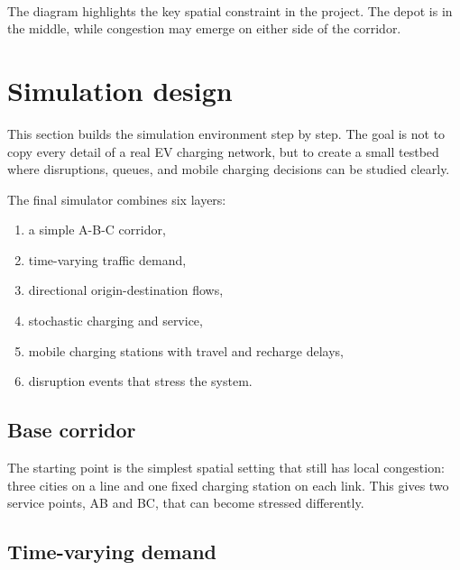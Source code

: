 \documentclass[11pt]{article}
\providecommand{\tightlist}{%
      \setlength{\itemsep}{0pt}\setlength{\parskip}{0pt}}
\begin{document}
    
    \begin{center}
    \end{center}
    { \hspace*{\fill} \\}
    
    The diagram highlights the key spatial constraint in the project. The
depot is in the middle, while congestion may emerge on either side of
the corridor.

    \hypertarget{toc-simulation-design}{}
    \section{Simulation design}\label{simulation-design}

This section builds the simulation environment step by step. The goal is
not to copy every detail of a real EV charging network, but to create a
small testbed where disruptions, queues, and mobile charging decisions
can be studied clearly.

The final simulator combines six layers:

\begin{enumerate}
\def\labelenumi{\arabic{enumi}.}
\tightlist
\item
  a simple A-B-C corridor,
\item
  time-varying traffic demand,
\item
  directional origin-destination flows,
\item
  stochastic charging and service,
\item
  mobile charging stations with travel and recharge delays,
\item
  disruption events that stress the system.
\end{enumerate}

    \subsection{Base corridor}\label{base-corridor}

The starting point is the simplest spatial setting that still has local
congestion: three cities on a line and one fixed charging station on
each link. This gives two service points, AB and BC, that can become
stressed differently.

    \subsection{Time-varying demand}\label{time-varying-demand}
\end{document}

